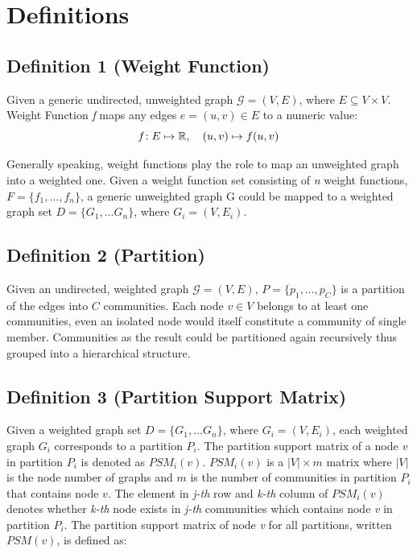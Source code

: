 \section{Definitions}


\subsection{Definition 1 (Weight Function)}

Given a generic undirected, unweighted graph $\mathcal{G}=(V,E)$,
where $E \subseteq V\times V$.
Weight Function \emph{f} maps any edges $e=(u,v) \in E$ to a numeric value:
\begin{equation}
\emph{f}: E \mapsto \mathbb {R},\quad (u,v)\mapsto f(u,v)
\nonumber
\end{equation}

Generally speaking, weight functions play the role to map an unweighted graph into a weighted one. Given a weight function set consisting of \emph{n} weight functions, $F=\{f_{1},...,f_{n}\}$, a generic unweighted graph G could be mapped to a weighted graph set $D=\{G_{1},...G_{n}\}$, where $G_{i}=(V,E_{i})$.

\subsection{Definition 2 (Partition)}

Given an undirected, weighted graph $\mathcal{G}=(V,E)$, $P=\{p_{1},...,p_{C}\}$ is a partition of the edges into $C$ communities. Each node $v \in V$ belongs to at least one communities, even an isolated node would itself constitute a community of single member. Communities as the result could be partitioned again recursively thus grouped into a hierarchical structure.

\subsection{Definition 3 (Partition Support Matrix)}

Given a weighted graph set $D=\{G_{1},...G_{n}\}$, where $G_{i}=(V,E_{i})$, each weighted graph $G_{i}$ corresponds to a partition $P_{i}$. The partition support matrix of a node \emph{v} in partition $P_{i}$ is denoted as $PSM_{i}(v)$. $PSM_{i}(v)$
is a $|V| \times m$ matrix where $|V|$ is the node number of graphs and $m$ is
the number of communities in partition $P_{i}$ that contains node $v$.
The element in \emph{j-th} row and \emph{k-th} column of $PSM_{i}(v)$ denotes whether \emph{k-th} node exists in \emph{j-th} communities which contains node \emph{v} in partition $P_{i}$. The partition support matrix of node \emph{v} for all partitions, written $PSM(v)$, is defined as:

